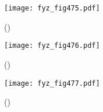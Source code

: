     \begin{figure}[ht!] %
      \centering
      \texttt{[image: fyz\_fig475.pdf]}
      \caption{ 
               (\cite[s.~707]{Feynman01})}
      \label{fyz_fig475}
    \end{figure}

    \begin{figure}[ht!] %
      \centering
      \texttt{[image: fyz\_fig476.pdf]}
      \caption{ 
               (\cite[s.~707]{Feynman01})}
      \label{fyz_fig476}
    \end{figure}

    \begin{figure}[ht!] %
      \centering
      \texttt{[image: fyz\_fig477.pdf]}
      \caption{ 
               (\cite[s.~707]{Feynman01})}
      \label{fyz_fig477}
    \end{figure}
  
\printbibliography[title={Seznam literatury}, heading=subbibliography]
